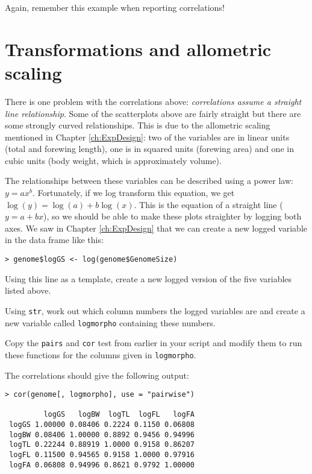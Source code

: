 \begin{compactitem}[$\quad\star$]
	\item Again, remember this example when reporting correlations!
\end{compactitem}

\section{Transformations and allometric scaling}

There is one problem with the correlations above: {\it correlations 
assume a straight line relationship}. Some of the scatterplots above 
are fairly straight but there are some strongly curved relationships. 
This is due to the allometric scaling mentioned in Chapter \ref{ch:ExpDesign}: two of 
the variables are in linear units (total and forewing length), one is 
in squared units (forewing area) and one in cubic units (body weight, 
which is approximately volume).

The relationships between these variables can be described using a 
power law: $y = ax^b$. Fortunately, if we log transform this equation, 
we get $\log(y) = \log(a) + b \log(x)$. This is the equation of a 
straight line ($y=a+bx$), so we should be able to make these plots 
straighter by logging both axes. We saw in Chapter \ref{ch:ExpDesign} that we can 
create a new logged variable in the data frame like this:

\begin{lstlisting}
> genome$logGS <- log(genome$GenomeSize)
\end{lstlisting}

\begin{compactitem}[$\quad\star$]
	\item Using this line as a template, create a new logged version of 
	the five variables listed above.
	\item Using {\tt str}, work out which column numbers the logged 
	variables are and create a new variable called {\tt logmorpho} 
	containing these numbers.
	\item Copy the {\tt pairs} and {\tt cor} test from earlier in your 
	script and modify them to run these functions for the columns given 
	in {\tt logmorpho}.
\end{compactitem}

The correlations should give the following output:
\begin{lstlisting}
> cor(genome[, logmorpho], use = "pairwise")

         logGS   logBW  logTL  logFL   logFA
 logGS 1.00000 0.08406 0.2224 0.1150 0.06808
 logBW 0.08406 1.00000 0.8892 0.9456 0.94996
 logTL 0.22244 0.88919 1.0000 0.9158 0.86207
 logFL 0.11500 0.94565 0.9158 1.0000 0.97916
 logFA 0.06808 0.94996 0.8621 0.9792 1.00000
\end{lstlisting}

